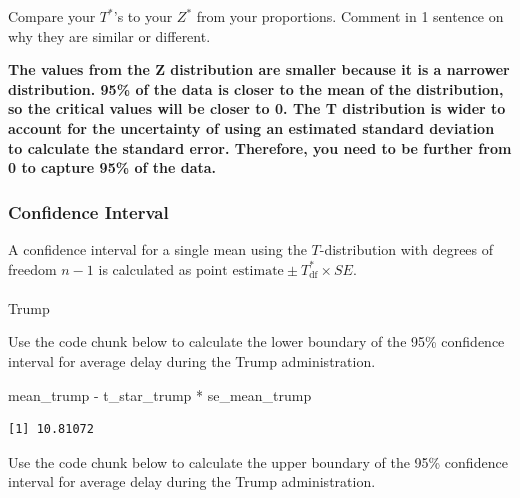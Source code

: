 \documentclass[
  letterpaper,
  DIV=11,
  numbers=noendperiod]{scrartcl}
\makeatletter
\let\oldparagraph\paragraph
\renewcommand{\paragraph}{
    \@ifstar
      \xxxParagraphStar
      \xxxParagraphNoStar
  }
\newcommand{\xxxParagraphStar}[1]{\oldparagraph*{#1}\mbox{}}
\newcommand{\xxxParagraphNoStar}[1]{\oldparagraph{#1}\mbox{}}
\newenvironment{Shaded}{\begin{snugshade}}{\end{snugshade}}
\newcommand{\NormalTok}[1]{\textcolor[rgb]{0.00,0.23,0.31}{#1}}
\newcommand{\SpecialCharTok}[1]{\textcolor[rgb]{0.37,0.37,0.37}{#1}}
\makeatother
\begin{document}
Compare your \(T^*\)'s to your \(Z^*\) from your proportions. Comment in
1 sentence on why they are similar or different.

\begin{tcolorbox}[enhanced jigsaw, toprule=.15mm, breakable, leftrule=.75mm, bottomrule=.15mm, rightrule=.15mm, colback=white, opacityback=0, colframe=quarto-callout-warning-color-frame, left=2mm, arc=.35mm]

\textbf{The values from the Z distribution are smaller because it is a
narrower distribution. 95\% of the data is closer to the mean of the
distribution, so the critical values will be closer to 0. The T
distribution is wider to account for the uncertainty of using an
estimated standard deviation to calculate the standard error. Therefore,
you need to be further from 0 to capture 95\% of the data.}

\end{tcolorbox}

\subsubsection{Confidence Interval}\label{confidence-interval-2}

A confidence interval for a single mean using the \(T\)-distribution
with degrees of freedom \(n-1\) is calculated as
\(\text{point estimate} \pm T^*_{\text{df}} \times SE\).

\paragraph{Trump}\label{trump-1}

Use the code chunk below to calculate the lower boundary of the 95\%
confidence interval for average delay during the Trump administration.

\begin{Shaded}
\begin{Highlighting}[]
\NormalTok{mean\_trump }\SpecialCharTok{{-}}\NormalTok{ t\_star\_trump }\SpecialCharTok{*}\NormalTok{ se\_mean\_trump}
\end{Highlighting}
\end{Shaded}

\begin{verbatim}
[1] 10.81072
\end{verbatim}

Use the code chunk below to calculate the upper boundary of the 95\%
confidence interval for average delay during the Trump administration.
\end{document}
